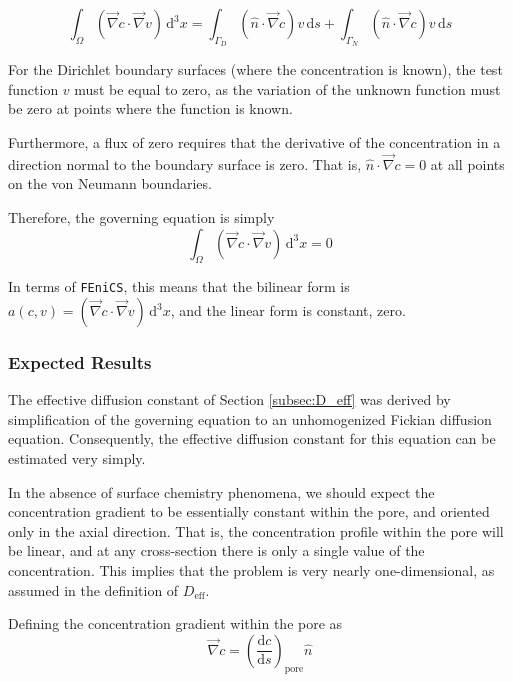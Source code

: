 \begin{equation}
\int_{\Omega} \left( \vec{\nabla}c \cdot \vec{\nabla}v \right) \,\mathrm{d}^3x =
\int_{\Gamma_D} \left( \hat{n} \cdot \vec{\nabla} c \right) v\,\mathrm{d}s
+\int_{\Gamma_N} \left( \hat{n} \cdot \vec{\nabla} c \right) v\,\mathrm{d}s
\end{equation}

For the Dirichlet boundary surfaces (where the concentration is known),
the test function $v$ must be equal to zero,
as the variation of the unknown function must be zero at points where the function is known.

Furthermore, a flux of zero requires that the derivative of the concentration in a direction
normal to the boundary surface is zero.
That is, $\hat{n} \cdot \vec{\nabla} c = 0$ at all points on the von Neumann boundaries.

Therefore, the governing equation is simply
\begin{equation}
\int_{\Omega} \left( \vec{\nabla}c \cdot \vec{\nabla}v \right) \,\mathrm{d}^3x = 0
\end{equation}

In terms of \texttt{FEniCS}, this means that the bilinear form is
$a(c,v)=\left( \vec{\nabla}c \cdot \vec{\nabla}v \right) \,\mathrm{d}^3x$,
and the linear form is constant, zero.

\subsubsection{Expected Results}\label{subsubsec:unhom_fick_expected}

The effective diffusion constant of Section \ref{subsec:D_eff}
was derived by simplification of the governing equation
to an unhomogenized Fickian diffusion equation.
Consequently, the effective diffusion constant for this equation
can be estimated very simply.

In the absence of surface chemistry phenomena,
we should expect the concentration gradient
to be essentially constant within the pore, and oriented only in the axial direction.
That is, the concentration profile within the pore will be linear,
and at any cross-section there is only a single value of the concentration.
This implies that the problem is very nearly one-dimensional,
as assumed in the definition of $D_{\mathrm{eff}}$.

Defining the concentration gradient within the pore as
\begin{equation}
\vec{\nabla} c = \left(\frac{\mathrm{d}c}{\mathrm{d}s}\right)_{\mathrm{pore}} \hat{n}
\end{equation}

